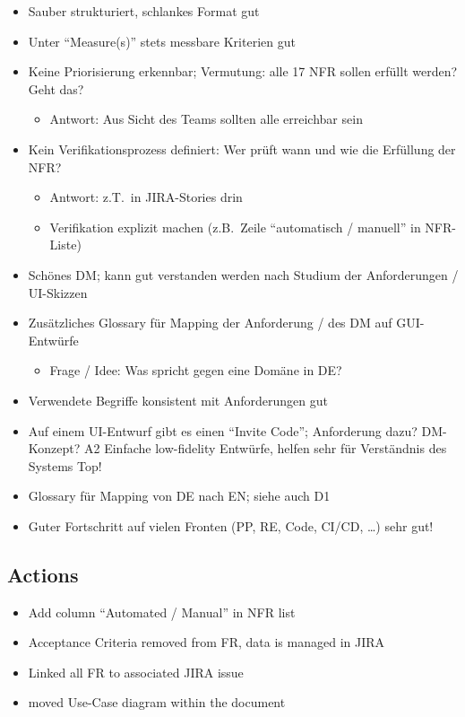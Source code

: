 \begin{itemize}
\begin{itemize}
    \end{itemize}
    \item Sauber strukturiert, schlankes Format \textrightarrow gut
    \item Unter ``Measure(s)'' stets messbare Kriterien \textrightarrow gut
    \item Keine Priorisierung erkennbar;
    Vermutung: alle 17 NFR sollen erfüllt werden?
    Geht das?
    \begin{itemize}
        \item Antwort: Aus Sicht des Teams sollten alle erreichbar sein
    \end{itemize}
    \item Kein Verifikationsprozess definiert: Wer prüft wann und wie die Erfüllung der NFR?
    \begin{itemize}
        \item Antwort: z.T.\ in JIRA-Stories drin
        \item Verifikation explizit machen (z.B.\ Zeile ``automatisch / manuell'' in NFR-Liste)
    \end{itemize}
    \item Schönes DM; kann gut verstanden werden nach Studium der Anforderungen / UI-Skizzen
    \item Zusätzliches Glossary für Mapping der Anforderung / des DM auf GUI-Entwürfe
    \begin{itemize}
        \item Frage / Idee: Was spricht gegen eine Domäne in DE?
    \end{itemize}
    \item Verwendete Begriffe konsistent mit Anforderungen \textrightarrow gut
    \item Auf einem UI-Entwurf gibt es einen ``Invite Code'';
    Anforderung dazu?
    DM-Konzept?
    A2 Einfache low-fidelity Entwürfe, helfen sehr für Verständnis des Systems \textrightarrow Top!
    \item Glossary für Mapping von DE nach EN; siehe auch D1
    \item Guter Fortschritt auf vielen Fronten (PP, RE, Code, CI/CD, \ldots) \textrightarrow sehr gut!
\end{itemize}

\subsection{Actions}

\begin{itemize}
    \item Add column ``Automated / Manual'' in NFR list
    \item Acceptance Criteria removed from FR, data is managed in JIRA
    \item Linked all FR to associated JIRA issue
    \item moved Use-Case diagram within the document
\end{itemize}


